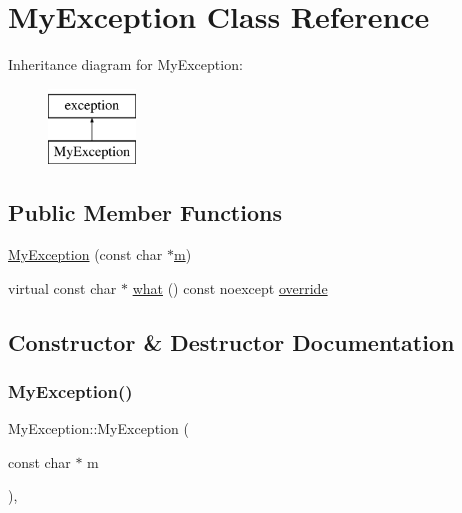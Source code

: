 \hypertarget{class_my_exception}{}\section{My\+Exception Class Reference}
\label{class_my_exception}
Inheritance diagram for My\+Exception\+:\begin{figure}[H]
\begin{center}
\leavevmode
\includegraphics[height=2.000000cm]{class_my_exception}
\end{center}
\end{figure}
\subsection*{Public Member Functions}
\begin{DoxyCompactItemize}
\item 
\mbox{\hyperlink{class_my_exception_abfe694fd781fe4301432e27e7dcfa249}{My\+Exception}} (const char $\ast$\mbox{\hyperlink{_s_d_l__opengl__glext_8h_af593500c283bf1a787a6f947f503a5c2}{m}})
\item 
virtual const char $\ast$ \mbox{\hyperlink{class_my_exception_ab8ff1f5d50dd5f229b9f74d9ea655236}{what}} () const noexcept \mbox{\hyperlink{dictobject_8h_a055cf4fd16bde9bce026127362cee1a3}{override}}
\end{DoxyCompactItemize}


\subsection{Constructor \& Destructor Documentation}
\mbox{\label{class_my_exception_abfe694fd781fe4301432e27e7dcfa249}} 
\subsubsection{\texorpdfstring{MyException()}{MyException()}}
{\footnotesize\ttfamily My\+Exception\+::\+My\+Exception (\begin{DoxyParamCaption}\item[{const char $\ast$}]{m }\end{DoxyParamCaption})\hspace{0.3cm}{\ttfamily [inline]}, {\ttfamily [explicit]}}



